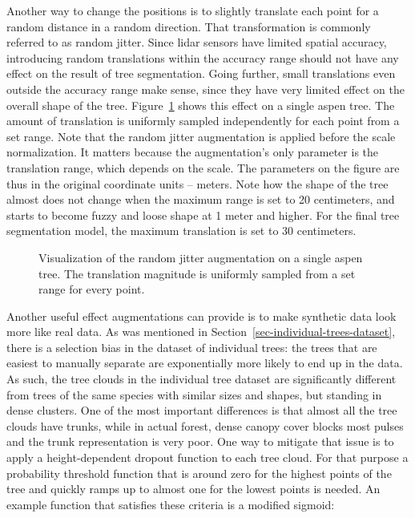 Another way to change the positions is to slightly translate each point for a random distance in a random direction.
That transformation is commonly referred to as random jitter.
Since \gls{lidar} sensors have limited spatial accuracy, introducing random translations within the accuracy range should not have any effect on the result of tree segmentation.
Going further, small translations even outside the accuracy range make sense, since they have very limited effect on the overall shape of the tree.
Figure~\ref{fig-random-jitter-effect} shows this effect on a single aspen tree.
The amount of translation is uniformly sampled independently for each point from a set range.
Note that the random jitter augmentation is applied before the scale normalization.
It matters because the augmentation's only parameter is the translation range, which depends on the scale.
The parameters on the figure are thus in the original coordinate units – meters.
Note how the shape of the tree almost does not change when the maximum range is set to 20 centimeters, and starts to become fuzzy and loose shape at 1 meter and higher.
For the final tree segmentation model, the maximum translation is set to 30 centimeters.

\begin{figure}
\caption[Visualization of the random jitter augmentation on a single aspen tree.]{\label{fig-random-jitter-effect}Visualization of the random
jitter augmentation on a single aspen tree. The translation magnitude is
uniformly sampled from a set range for every point.}
\end{figure}

Another useful effect augmentations can provide is to make synthetic data look more like real data.
As was mentioned in Section~\ref{sec-individual-trees-dataset}, there is a selection bias in the dataset of individual trees: the trees that are easiest to manually separate are exponentially more likely to end up in the data.
As such, the tree clouds in the individual tree dataset are significantly different from trees of the same species with similar sizes and shapes, but standing in dense clusters.
One of the most important differences is that almost all the tree clouds have trunks, while in actual forest, dense canopy cover blocks most pulses and the trunk representation is very poor.
One way to mitigate that issue is to apply a height-dependent dropout function to each tree cloud.
For that purpose a probability threshold function that is around zero for the highest points of the tree and quickly ramps up to almost one for the lowest points is needed.
An example function that satisfies these criteria is a modified sigmoid:

